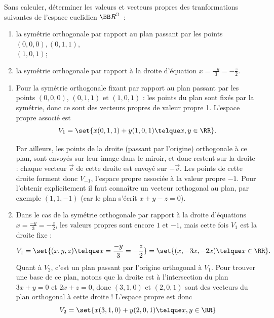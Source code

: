 \documentclass[12pt,french,oneside,a4paper]{memoir} %
\begin{document}
\begin{exo} %
Sans calculer, déterminer les valeurs et vecteurs propres des 
tranformations suivantes de l'espace euclidien ${\BB R}^3$~:
\begin{enumerate}
\item la symétrie orthogonale par rapport au plan passant par les 
points $(0,0,0), (0,1,1),$ \\ $(1,0,1)$;
\item la symétrie orthogonale par rapport à la droite d'équation 
$\displaystyle{x= \frac{-y}{3}= - \frac{z}{2}}$.
\end{enumerate}

\begin{correction}
  \begin{enumerate}
  \item Pour la symétrie orthogonale fixant par rapport au plan passant par les points $(0,0,0)$, $(0,1,1)$ et $(1,0,1)$ : les points du plan sont fixés par la symétrie, donc ce sont des vecteurs propres de valeur propre 1. L'espace propre associé est
    \begin{equation*}
      V_1 = \set{x (0,1,1) + y (1,0,1) \telque x,y \in \RR}.
    \end{equation*}

    Par ailleurs, les points de la droite (passant par l'origine) orthogonale à ce plan, sont envoyés sur leur image dans le miroir, et donc restent sur la droite : chaque vecteur $\vec v$ de cette droite est envoyé sur $-\vec v$. Les points de cette droite forment donc $V_{-1}$, l'espace propre associée à la valeur propre $-1$. Pour l'obtenir explicitement il faut connaître un vecteur orthogonal au plan, par exemple $(1,1,-1)$ (car le plan s'écrit $x + y - z = 0$).
  \item Dans le cas de la symétrie orthogonale par rapport à la droite d'équations $x= \frac{-y}{3}= - \frac{z}{2}$, les valeurs propres sont encore $1$ et $-1$, mais cette fois $V_{1}$ est la droite fixe :
    \begin{equation*}
      V_{1} = \set{ (x,y,z) \telque x= \frac{-y}{3}= - \frac{z}{2} } = \set{ (x, -3x, -2x)\telque x \in \RR}.
    \end{equation*}
    Quant à $V_{2}$, c'est un plan passant par l'origine orthogonal à $V_{1}$. Pour trouver une base de ce plan, notons que la droite est à l'intersection du plan $3x + y = 0$ et $2x + z = 0$, donc $(3,1,0)$ et $(2,0,1)$ sont des vecteurs du plan orthogonal à cette droite ! L'espace propre est donc
    \begin{equation*}
      V_{2} = \set{ x (3,1,0) + y (2,0,1) \telque x,y \in \RR }
    \end{equation*}
  \end{enumerate}
\end{correction}
\end{exo}
\end{document}
